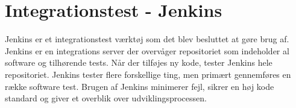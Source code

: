 \newpage

\section{Integrationstest - Jenkins}
Jenkins er et integrationstest værktøj som det blev besluttet at gøre brug af. 
Jenkins er en integrations server der overvåger repositoriet som indeholder al software og tilhørende tests. Når der tilføjes ny kode, tester Jenkins hele repositoriet. 
Jenkins tester flere forskellige ting, men primært gennemføres en række software test. Brugen af Jenkins minimerer fejl, sikrer en høj kode standard og giver et overblik over udviklingsprocessen.  